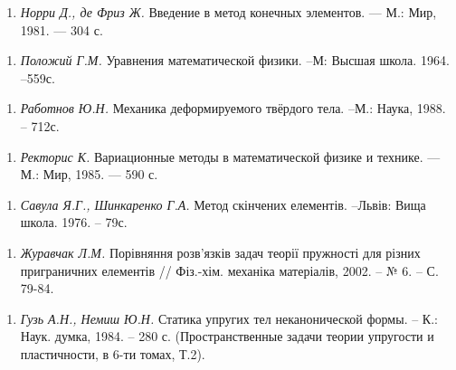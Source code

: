 \begin{enumerate}
\def\labelenumi{\arabic{enumi}.}
\tightlist
\item
  \emph{Норри Д., де Фриз Ж.} Введение в метод конечных элементов. ---
  М.: Мир, 1981. --- 304 с.\emph{ }
\end{enumerate}

\begin{enumerate}
\def\labelenumi{\arabic{enumi}.}
\tightlist
\item
  \emph{ Положий Г.М.} Уравнения математической физики. --М: Высшая
  школа. 1964. --559с.
\end{enumerate}

\begin{enumerate}
\def\labelenumi{\arabic{enumi}.}
\tightlist
\item
  \emph{ Работнов Ю.Н.} Механика деформируемого твёрдого тела. --М.:
  Наука, 1988. -- 712с.
\end{enumerate}

\begin{enumerate}
\def\labelenumi{\arabic{enumi}.}
\tightlist
\item
  \emph{ }\protect\hypertarget{anchor-39}{}{}\emph{Ректорис К.}
  Вариационные методы в математической физике и технике. --- М.: Мир,
  1985. --- 590 с.
\end{enumerate}

\begin{enumerate}
\def\labelenumi{\arabic{enumi}.}
\tightlist
\item
  \emph{ Савула Я.Г., Шинкаренко Г.А.} Метод скінчених елементів.
  --Львів: Вища школа. 1976. -- 79с.
\end{enumerate}

\begin{enumerate}
\def\labelenumi{\arabic{enumi}.}
\tightlist
\item
  \emph{ }\protect\hypertarget{anchor-58}{}{}\emph{Журавчак Л.М.}
  Порівняння розв'язків задач теорії пружності для різних пригра­ничних
  елемен­тів // Фіз.-хім. меха­ніка матеріалів, 2002. -- № 6. -- С.
  79-84.
\end{enumerate}

\begin{enumerate}
\def\labelenumi{\arabic{enumi}.}
\tightlist
\item
  \protect\hypertarget{anchor-15}{}{}\emph{Гузь А.Н., Немиш Ю.Н.}
  Статика упругих тел неканонической формы. -- К.: Наук. думка, 1984. --
  280 с. (Пространственные задачи теории упругости и пластичности, в
  6-ти томах, Т.2).
\end{enumerate}

